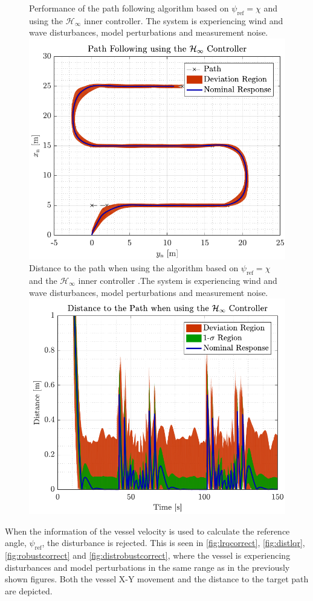 \begin{figure}[H]
	\captionbox 
	{   
		Performance of the path following algorithm based on $\psi_\mathrm{ref}=\chi$ and using the $\mathcal{H}_\infty$ inner controller. The system is experiencing wind and wave disturbances, model perturbations and measurement noise.\label{fig:robwrong}
	}                                                                 
	{                                                                  
		\includegraphics[width=.45\textwidth]{figures/path_rob_no_correc}         
	}                                                                    
	\hspace{5pt}                                                          
	\captionbox  
	{      
		Distance to the path when using the algorithm based on $\psi_\mathrm{ref}=\chi$ and the $\mathcal{H}_\infty$ inner controller .The system is experiencing wind and wave disturbances, model perturbations and measurement noise.\label{fig:distrobwrong}
	}                                                                          
	{
		\includegraphics[width=.45\textwidth]{figures/dist_rob_no_correc}
	}
\end{figure}
When the information of the vessel velocity is used to calculate the reference angle, $\psi_\mathrm{ref}$, the disturbance is rejected. This is seen in \autoref{fig:lrqcorrect}, \ref{fig:distlqr}, \ref{fig:robustcorrect} and \ref{fig:distrobustcorrect}, where the vessel is experiencing disturbances and model perturbations in the same range as in the previously shown figures. Both the vessel X-Y movement and the distance to the target path are depicted. 

